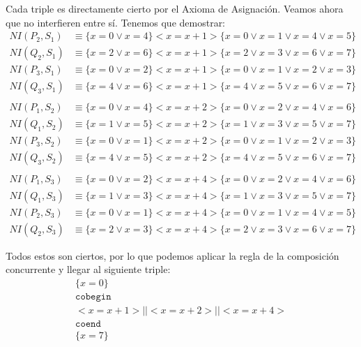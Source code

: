 \begin{ejercicio}
    Cada triple es directamente cierto por el Axioma de Asignación. Veamos ahora que no interfieren entre sí. Tenemos que demostrar:
    \begin{align*}
        NI(P_2, S_1) &\equiv \{x=0 \lor x=4\} <x=x+1> \{x=0\lor x=1\lor x=4\lor x=5\} \\
        NI(Q_2, S_1) &\equiv \{x=2 \lor x=6\} <x=x+1> \{x=2\lor x=3\lor x=6\lor x=7\} \\
        NI(P_3, S_1) &\equiv \{x=0 \lor x=2\} <x=x+1> \{x=0\lor x=1\lor x=2\lor x=3\} \\
        NI(Q_3, S_1) &\equiv \{x=4 \lor x=6\} <x=x+1> \{x=4\lor x=5\lor x=6\lor x=7\} \\ \\
        NI(P_1, S_2) &\equiv \{x=0 \lor x=4\} <x=x+2> \{x=0\lor x=2\lor x=4\lor x=6\} \\
        NI(Q_1, S_2) &\equiv \{x=1 \lor x=5\} <x=x+2> \{x=1\lor x=3\lor x=5\lor x=7\} \\
        NI(P_3, S_2) &\equiv \{x=0 \lor x=1\} <x=x+2> \{x=0\lor x=1\lor x=2\lor x=3\} \\
        NI(Q_3, S_2) &\equiv \{x=4 \lor x=5\} <x=x+2> \{x=4\lor x=5\lor x=6\lor x=7\} \\ \\
        NI(P_1, S_3) &\equiv \{x=0 \lor x=2\} <x=x+4> \{x=0\lor x=2\lor x=4\lor x=6\} \\
        NI(Q_1, S_3) &\equiv \{x=1 \lor x=3\} <x=x+4> \{x=1\lor x=3\lor x=5\lor x=7\} \\
        NI(P_2, S_3) &\equiv \{x=0 \lor x=1\} <x=x+4> \{x=0\lor x=1\lor x=4\lor x=5\} \\
        NI(Q_2, S_3) &\equiv \{x=2 \lor x=3\} <x=x+4> \{x=2\lor x=3\lor x=6\lor x=7\}
    \end{align*}

    Todos estos son ciertos, por lo que podemos aplicar la regla de la composición concurrente y llegar al siguiente triple:
    \begin{gather*}
        \{x=0\} \\
        \texttt{cobegin} \\
        <x=x+1> || <x=x+2> || <x=x+4> \\
        \texttt{coend} \\
        \{x=7\}
    \end{gather*}
\end{ejercicio}

